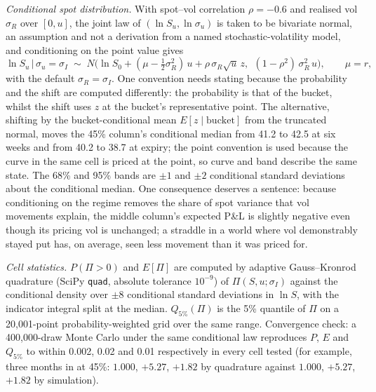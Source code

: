 \documentclass[11pt,a4paper]{article}
\newcommand{\PnL}{P\&L}
\begin{document}
\emph{Conditional spot distribution.} With spot--vol correlation $\rho = -0.6$ and realised vol $\sigma_R$ over $[0,u]$, the joint law of $(\ln S_u, \ln\sigma_u)$ is taken to be bivariate normal, an assumption and not a derivation from a named stochastic-volatility model, and conditioning on the point value gives
\[
\ln S_u \,\big|\, \sigma_u = \sigma_I \;\sim\; N\!\Big(\ln S_0 + (\mu - \tfrac12\sigma_R^2)\,u + \rho\,\sigma_R\sqrt{u}\,z,\ \ (1-\rho^2)\,\sigma_R^2\,u\Big), \qquad \mu = r,
\]
with the default $\sigma_R = \sigma_I$. One convention needs stating because the probability and the shift are computed differently: the probability is that of the bucket, whilst the shift uses $z$ at the bucket's representative point. The alternative, shifting by the bucket-conditional mean $E[z \mid \text{bucket}]$ from the truncated normal, moves the 45\% column's conditional median from 41.2 to 42.5 at six weeks and from 40.2 to 38.7 at expiry; the point convention is used because the curve in the same cell is priced at the point, so curve and band describe the same state. The 68\% and 95\% bands are $\pm 1$ and $\pm 2$ conditional standard deviations about the conditional median. One consequence deserves a sentence: because conditioning on the regime removes the share of spot variance that vol movements explain, the middle column's expected \PnL{} is slightly negative even though its pricing vol is unchanged; a straddle in a world where vol demonstrably stayed put has, on average, seen less movement than it was priced for.

\emph{Cell statistics.} $P(\Pi > 0)$ and $E[\Pi]$ are computed by adaptive Gauss--Kronrod quadrature (SciPy \texttt{quad}, absolute tolerance $10^{-9}$) of $\Pi(S,u;\sigma_I)$ against the conditional density over $\pm 8$ conditional standard deviations in $\ln S$, with the indicator integral split at the median. $Q_{5\%}(\Pi)$ is the 5\% quantile of $\Pi$ on a 20,001-point probability-weighted grid over the same range. Convergence check: a 400,000-draw Monte Carlo under the same conditional law reproduces $P$, $E$ and $Q_{5\%}$ to within 0.002, 0.02 and 0.01 respectively in every cell tested (for example, three months in at 45\%: $1.000$, $+5.27$, $+1.82$ by quadrature against $1.000$, $+5.27$, $+1.82$ by simulation).
\end{document}
